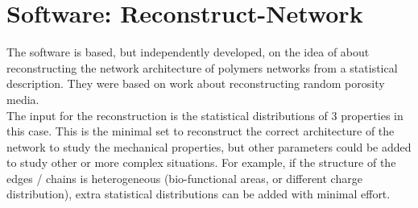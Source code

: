 
\chapter{Software: Reconstruct-Network} %

\label{Appendix-Reconstruct} %


The  software is based, but independently developed,  on the idea of
\citet{lindstrom_biopolymer_2010} about reconstructing the network
architecture of polymers networks from a statistical description. They were
based on \citet{yeong_reconstructing_1998,yeong_reconstructing_1998-1} work
about  reconstructing random porosity media.\\
The input for the reconstruction is the
statistical distributions of $3$ properties in this case. This is the minimal 
set to reconstruct the correct architecture of the network to study the
mechanical properties, but other parameters could be added to study other or
more complex situations.  For example, if the structure of the edges / chains is
heterogeneous  (bio-functional areas, or different charge distribution), extra
statistical distributions can be added with minimal effort.
